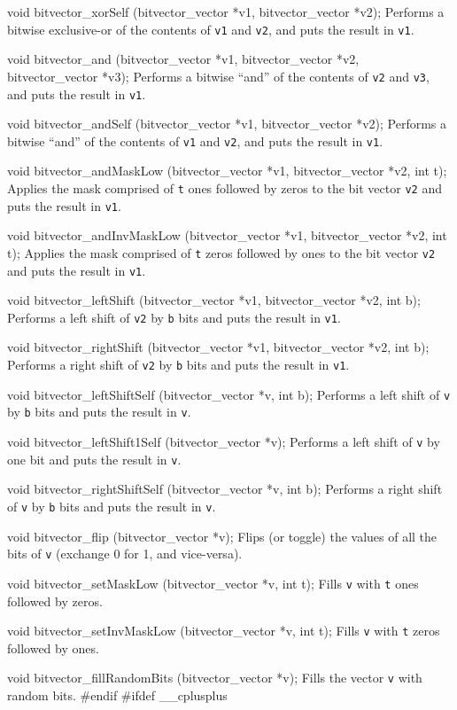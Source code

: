 {void bitvector_xorSelf (bitvector_vector *v1, bitvector_vector *v2);
\endcode
 \tab
Performs a bitwise exclusive-or of the contents of \texttt{v1} and \texttt{v2},
and puts the result in \texttt{v1}.
 \endtab
\code

void bitvector_and (bitvector_vector *v1, bitvector_vector *v2, 
                    bitvector_vector *v3);
\endcode
 \tab
Performs a bitwise ``and'' of the contents of \texttt{v2} and \texttt{v3},
and puts the result in \texttt{v1}.
 \endtab
\code

void bitvector_andSelf (bitvector_vector *v1, bitvector_vector *v2);
\endcode
 \tab
Performs a bitwise ``and'' of the contents of \texttt{v1} and \texttt{v2},
and puts the result in \texttt{v1}.
 \endtab
\code

void bitvector_andMaskLow (bitvector_vector *v1, bitvector_vector *v2, int t);
\endcode
 \tab
Applies the mask comprised of {\tt t} ones followed by zeros to the bit vector
{\tt v2} and puts the result in {\tt v1}.
\endtab
\code

void bitvector_andInvMaskLow (bitvector_vector *v1, bitvector_vector *v2, int t);
\endcode
 \tab
Applies the mask comprised of {\tt t} zeros followed by ones to the bit vector
{\tt v2} and puts the result in {\tt v1}.
 \endtab
\code

void bitvector_leftShift (bitvector_vector *v1, bitvector_vector *v2, int b);
\endcode
 \tab
Performs a left shift of \texttt{v2} by \texttt{b} bits
and puts the result in \texttt{v1}.
 \endtab
\code

void bitvector_rightShift (bitvector_vector *v1, bitvector_vector *v2, int b);
\endcode
 \tab
Performs a right shift of \texttt{v2} by \texttt{b} bits
and puts the result in \texttt{v1}.
 \endtab
\code

void bitvector_leftShiftSelf (bitvector_vector *v, int b);
\endcode
 \tab
Performs a left shift of \texttt{v} by \texttt{b} bits
and puts the result in \texttt{v}.
 \endtab
\code

void bitvector_leftShift1Self (bitvector_vector *v);
\endcode
 \tab
Performs a left shift of \texttt{v} by one bit
and puts the result in \texttt{v}.
 \endtab
\code

void bitvector_rightShiftSelf (bitvector_vector *v, int b);
\endcode
 \tab
Performs a right shift of \texttt{v} by \texttt{b} bits
and puts the result in \texttt{v}.
 \endtab
\code

void bitvector_flip (bitvector_vector *v);
\endcode
 \tab
Flips (or toggle) the values of all the bits of {\tt v} (exchange 0 for 1, and vice-versa).
 \endtab
\code

void bitvector_setMaskLow (bitvector_vector *v, int t);
\endcode
 \tab
Fills {\tt v} with {\tt t} ones followed by zeros.
 \endtab
\code

void bitvector_setInvMaskLow (bitvector_vector *v, int t);
\endcode
 \tab
Fills {\tt v} with {\tt t} zeros followed by ones.
 \endtab
\code

void bitvector_fillRandomBits (bitvector_vector *v);
\endcode
 \tab
Fills the vector {\tt v} with random bits.
 \endtab
\code\hide
#endif
#ifdef __cplusplus
}
